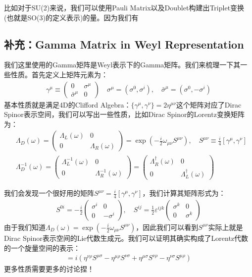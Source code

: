 比如对于SU(2)来说，我们可以使用Pauli Matrix以及Doublet构建出Triplet变换(也就是SO(3)的定义表示)的量。因为我们有




\subsection{补充：Gamma Matrix in Weyl Representation}



我们这里使用的Gamma矩阵是Weyl表示下的Gamma矩阵。我们来梳理一下其一些性质。首先定义上矩阵元素为：
\begin{align}
  \gamma^{\mu}\equiv\begin{pmatrix}0&\sigma^{\mu}\\\bar{\sigma}^{\mu}&0\end{pmatrix} \quad \sigma^{\mu}=(\sigma^0,\sigma^i),\quad \bar{\sigma}^{\mu}=(\sigma^0,-\sigma^i)
\end{align}
基本性质就是满足4D的Clifford Algebra：$ \{\gamma^{\mu},\gamma^{\nu}\}=2\eta^{\mu\nu} $这个矩阵对应了Dirac Spinor表示空间，我们可以写出一些性质，比如Dirac Spinor的Lorentz变换矩阵为：
\begin{align}
  &\Lambda_{D}(\omega)=\begin{pmatrix}\Lambda_{L}(\omega)&0\\0&\Lambda_{R}(\omega)\end{pmatrix}=\exp\left(-\frac{i}{2}\omega_{\mu\nu}S^{\mu\nu}\right) , \quad S^{\mu\nu}\equiv\frac{i}{4}[\gamma^{\mu},\gamma^{\nu}]  \\ 
  &\Lambda_D^{-1}(\omega)=\begin{pmatrix}\Lambda_{L}^{-1}(\omega)&0\\0&\Lambda_{R}^{-1}(\omega)\end{pmatrix}= \begin{pmatrix}\Lambda_{R}^\dagger(\omega)&0\\0&\Lambda_{L}^\dagger(\omega)\end{pmatrix}
\end{align}

\bigskip
{}

我们会发现一个很好用的矩阵$ S^{\mu\nu} = \frac{i}{4}[\gamma^\mu,\gamma^\nu] $，我们计算其矩阵形式为：
\begin{align}
  S^{0i}=-\frac{i}{2}\begin{pmatrix}\sigma^i&0\\0&-\sigma^i\end{pmatrix},\quad S^{ij}=\frac{1}{2}\varepsilon^{ijk}\begin{pmatrix}\sigma^k&0\\0&\sigma^k\end{pmatrix}
\end{align}
由于我们知道$  \Lambda_D(\omega)=\exp\left(-\frac{i}{2}\omega_{\mu\nu}S^{\mu\nu}\right) $，因此我们可以看到$ S^{\mu\nu} $实际上就是Dirac Spinor表示空间的Lie代数生成元。我们可以证明其确实构成了Lorentz代数的一个旋量空间的表示：
\begin{align}
  [S^{\mu\nu},S^{\rho\sigma}]=i(\eta^{\nu\rho}S^{\mu\sigma}-\eta^{\mu\rho}S^{\nu\sigma}+\eta^{\mu\sigma}S^{\nu\rho}-\eta^{\nu\sigma}S^{\mu\rho})
\end{align}
更多性质需要更多的讨论捏！

